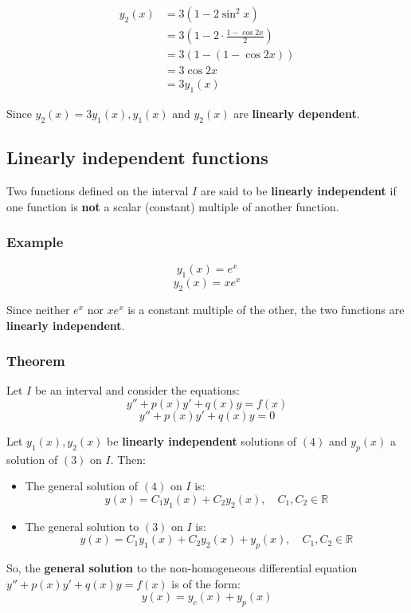 \documentclass[11pt]{article}
\begin{document}
\begin{align*}
y_2(x) &= 3 (1 - 2 \sin^2 x) \\
&= 3 \left( 1 - 2 \cdot \frac{1 - \cos 2x}{2} \right) \\
&= 3 (1 - (1 - \cos 2x)) \\
&= 3 \cos 2x \\
&= 3y_1(x)
\end{align*}

Since \(y_2(x) = 3y_1(x), y_1(x) \text{ and } y_2(x)\) are \textbf{linearly dependent}.

\newpage

\subsection{Linearly independent functions}
\label{sec:orgc68162b}
Two functions defined on the interval \(I\) are said to be \textbf{linearly independent} if one function is \textbf{not} a scalar (constant) multiple of another function.

\subsubsection{Example}
\label{sec:orgbeae32b}
\[y_1(x) = e^x\]
\[y_2(x) = xe^x\]

Since neither \(e^x\) nor \(xe^x\) is a constant multiple of the other, the two functions are \textbf{linearly independent}.

\subsubsection{Theorem}
\label{sec:org9bef716}
Let \(I\) be an interval and consider the equations:
\[y'' + p(x)y' + q(x)y = f(x) \tag{3}\]
\[y'' + p(x)y' + q(x)y = 0 \tag{4}\]

Let \(y_1(x), y_2(x)\) be \textbf{linearly independent} solutions of \((4)\) and \(y_p(x)\) a solution of \((3)\) on \(I\). Then:
\begin{itemize}
\item The general solution of \((4)\) on \(I\) is:
\[y(x) = C_1 y_1(x) + C_2 y_2(x), \quad C_1, C_2 \in \mathbb{R}\]
\item The general solution to \((3)\) on \(I\) is:
\[y(x) = C_1 y_1(x) + C_2 y_2(x) + y_p(x), \quad C_1, C_2 \in \mathbb{R}\]
\end{itemize}

So, the \textbf{general solution} to the non-homogeneous differential equation \(y'' + p(x)y' + q(x)y = f(x)\) is of the form:
\[y(x) = y_c(x) + y_p(x)\]
\end{document}
